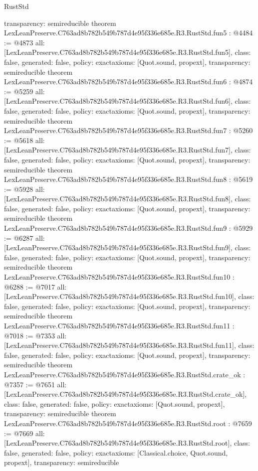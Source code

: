 \begin{lexlean}{RustStd}
\begin{coremodule}
{  transparency: semireducible
}
theorem LexLeanPreserve.C763ad8b782b549b787d4e95f336e685e.R3.RustStd.fun5 : @4484 := @4873 {
  all: [LexLeanPreserve.C763ad8b782b549b787d4e95f336e685e.R3.RustStd.fun5],
  class: false,
  generated: false,
  policy: exact{axioms: [Quot.sound, propext]},
  transparency: semireducible
}
theorem LexLeanPreserve.C763ad8b782b549b787d4e95f336e685e.R3.RustStd.fun6 : @4874 := @5259 {
  all: [LexLeanPreserve.C763ad8b782b549b787d4e95f336e685e.R3.RustStd.fun6],
  class: false,
  generated: false,
  policy: exact{axioms: [Quot.sound, propext]},
  transparency: semireducible
}
theorem LexLeanPreserve.C763ad8b782b549b787d4e95f336e685e.R3.RustStd.fun7 : @5260 := @5618 {
  all: [LexLeanPreserve.C763ad8b782b549b787d4e95f336e685e.R3.RustStd.fun7],
  class: false,
  generated: false,
  policy: exact{axioms: [Quot.sound, propext]},
  transparency: semireducible
}
theorem LexLeanPreserve.C763ad8b782b549b787d4e95f336e685e.R3.RustStd.fun8 : @5619 := @5928 {
  all: [LexLeanPreserve.C763ad8b782b549b787d4e95f336e685e.R3.RustStd.fun8],
  class: false,
  generated: false,
  policy: exact{axioms: [Quot.sound, propext]},
  transparency: semireducible
}
theorem LexLeanPreserve.C763ad8b782b549b787d4e95f336e685e.R3.RustStd.fun9 : @5929 := @6287 {
  all: [LexLeanPreserve.C763ad8b782b549b787d4e95f336e685e.R3.RustStd.fun9],
  class: false,
  generated: false,
  policy: exact{axioms: [Quot.sound, propext]},
  transparency: semireducible
}
theorem LexLeanPreserve.C763ad8b782b549b787d4e95f336e685e.R3.RustStd.fun10 : @6288 := @7017 {
  all: [LexLeanPreserve.C763ad8b782b549b787d4e95f336e685e.R3.RustStd.fun10],
  class: false,
  generated: false,
  policy: exact{axioms: [Quot.sound, propext]},
  transparency: semireducible
}
theorem LexLeanPreserve.C763ad8b782b549b787d4e95f336e685e.R3.RustStd.fun11 : @7018 := @7353 {
  all: [LexLeanPreserve.C763ad8b782b549b787d4e95f336e685e.R3.RustStd.fun11],
  class: false,
  generated: false,
  policy: exact{axioms: [Quot.sound, propext]},
  transparency: semireducible
}
theorem LexLeanPreserve.C763ad8b782b549b787d4e95f336e685e.R3.RustStd.crate_ok : @7357 := @7651 {
  all: [LexLeanPreserve.C763ad8b782b549b787d4e95f336e685e.R3.RustStd.crate_ok],
  class: false,
  generated: false,
  policy: exact{axioms: [Quot.sound, propext]},
  transparency: semireducible
}
theorem LexLeanPreserve.C763ad8b782b549b787d4e95f336e685e.R3.RustStd.root : @7659 := @7669 {
  all: [LexLeanPreserve.C763ad8b782b549b787d4e95f336e685e.R3.RustStd.root],
  class: false,
  generated: false,
  policy: exact{axioms: [Classical.choice, Quot.sound, propext]},
  transparency: semireducible
}


\end{coremodule}
\end{lexlean}
